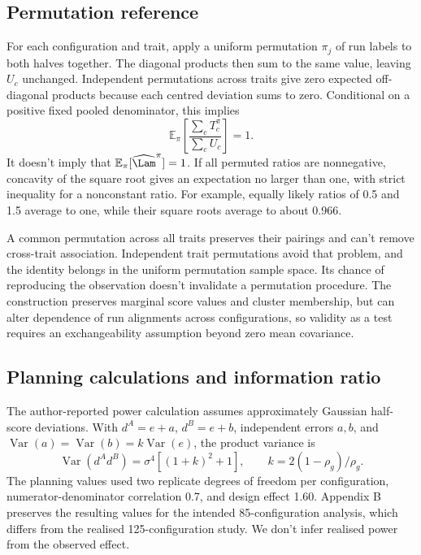 \subsection{Permutation reference}
For each configuration and trait, apply a uniform permutation $\pi_j$ of run labels to both halves together. The diagonal products then sum to the same value, leaving $U_c$ unchanged. Independent permutations across traits give zero expected off-diagonal products because each centred deviation sums to zero. Conditional on a positive fixed pooled denominator, this implies
\begin{equation}
\mathbb E_\pi\left[\frac{\sum_cT_c^\pi}{\sum_cU_c}\right]=1.
\end{equation}
It doesn't imply that $\mathbb E_\pi[\widehat\Lam^\pi]=1$. If all permuted ratios are nonnegative, concavity of the square root gives an expectation no larger than one, with strict inequality for a nonconstant ratio. For example, equally likely ratios of 0.5 and 1.5 average to one, while their square roots average to about 0.966.

A common permutation across all traits preserves their pairings and can't remove cross-trait association. Independent trait permutations avoid that problem, and the identity belongs in the uniform permutation sample space. Its chance of reproducing the observation doesn't invalidate a permutation procedure. The construction preserves marginal score values and cluster membership, but can alter dependence of run alignments across configurations, so validity as a test requires an exchangeability assumption beyond zero mean covariance.

\subsection{Planning calculations and information ratio}
The author-reported power calculation assumes approximately Gaussian half-score deviations. With $d^A=e+a$, $d^B=e+b$, independent errors $a,b$, and $\operatorname{Var}(a)=\operatorname{Var}(b)=k\operatorname{Var}(e)$, the product variance is
\begin{equation}
\operatorname{Var}(d^Ad^B)=\sigma^4[(1+k)^2+1],\qquad
k=2(1-\rho_g)/\rho_g.
\end{equation}
The planning values used two replicate degrees of freedom per configuration, numerator-denominator correlation 0.7, and design effect 1.60. Appendix B preserves the resulting values for the intended 85-configuration analysis, which differs from the realised 125-configuration study. We don't infer realised power from the observed effect.

